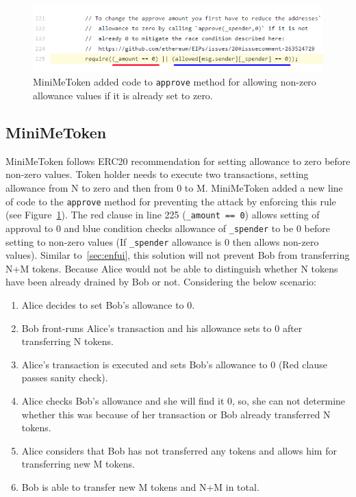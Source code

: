 \begin{figure}[t]
	\centering
	\includegraphics[width=1.0\linewidth]{figures/multiple_withdrawal_06.png}
	\caption{MiniMeToken added code to \texttt{approve} method for allowing non-zero allowance values if it is already set to zero.\label{fig:mini}}
\end{figure}

\subsection{MiniMeToken}\label{sec:MiniMeToken}
MiniMeToken\cite{Ref15} follows ERC20 recommendation for setting allowance to zero before non-zero values. Token holder needs to execute two transactions, setting allowance from N to zero and then from 0 to M. MiniMeToken added a new line of code to the \texttt{approve} method for preventing the attack by enforcing this rule (see Figure~\ref{fig:mini}). The red clause in line 225 (\texttt{\_amount == 0}) allows setting of approval to 0 and blue condition checks allowance of \texttt{\_spender} to be 0 before setting to non-zero values (\ie If \texttt{\_spender} allowance is 0 then allows non-zero values). Similar to~\ref{sec:enfui}, this solution will not prevent Bob from transferring N+M tokens. Because Alice would not be able to distinguish whether N tokens have been already drained by Bob or not. Considering the below scenario:
\begin{enumerate}
	\item Alice decides to set Bob’s allowance to 0.
	\item Bob front-runs Alice’s transaction and his allowance sets to 0 after transferring N tokens.
	\item Alice’s transaction is executed and sets Bob’s allowance to 0 (Red clause passes sanity check).
	\item Alice checks Bob’s allowance and she will find it 0, so, she can not determine whether this was because of her transaction or Bob already transferred N tokens.
	\item Alice considers that Bob has not transferred any tokens and allows him for transferring new M tokens.
	\item Bob is able to transfer new M tokens and N+M in total.
\end{enumerate}


